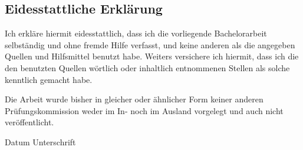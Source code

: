 \subsection*{Eidesstattliche Erklärung}
Ich erkläre hiermit eidesstattlich, dass ich die vorliegende Bachelorarbeit
selbständig und ohne fremde Hilfe verfasst, und keine anderen als die
angegeben Quellen und Hilfsmittel benutzt habe.
Weiters versichere ich hiermit, dass ich die den benutzten Quellen wörtlich
oder inhaltlich entnommenen Stellen als solche kenntlich gemacht habe.

Die Arbeit wurde bisher in gleicher oder ähnlicher Form keiner anderen
Prüfungskommission weder im In- noch im Ausland vorgelegt und auch nicht
veröffentlicht.

\vspace*{3cm}
Datum
\hfill
Unterschrift

